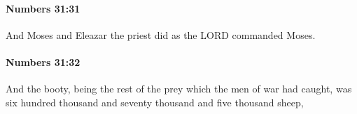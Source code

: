 		\paragraph{Numbers 31:31} %
			\label{NUMBERS-31-31}

			And Moses and Eleazar the priest did as the LORD commanded Moses.


		\paragraph{Numbers 31:32} %
			\label{NUMBERS-31-32}

			And the booty, being the rest of the prey which the men of war had caught, was six hundred thousand and seventy thousand and five thousand sheep,


